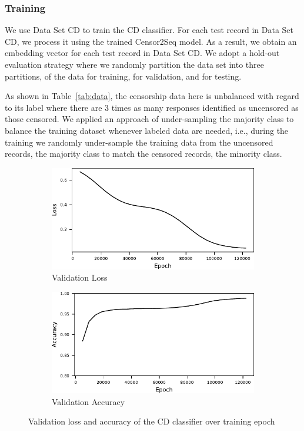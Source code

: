 \subsubsection{Training}
\label{sec:eval:cd:train}

We use Data Set CD to train the CD classifier. For each test record in Data Set
CD, we process it using the trained Censor2Seq model. As a result, we obtain an
embedding vector for each test record in Data Set CD. We adopt a
hold-out evaluation strategy where we randomly partition the data set
into three partitions, \CDtrainratio of the data for training, \CDvalidratio
for validation, and \CDtestratio for testing. 

As shown in Table~\ref{tab:data}, the censorship data here is unbalanced with
regard to its label where there are 3 times as many responses identified as
uncensored as those censored.  We applied an approach of under-sampling the
majority class to balance the training dataset whenever labeled data are
needed, i.e., during the training we randomly under-sample the training data
from the uncensored records, the majority class to match the censored records,
the minority class.


\begin{figure}[!htbp]
  \centering
	\begin{subfigure}[b]{0.8\columnwidth}
		\centering
		\includegraphics[width=\textwidth]{figures/le_val_loss.pdf}
		\caption{Validation Loss}
    \label{fig:le_val_loss}
	\end{subfigure}
	\hfill
	\begin{subfigure}[b]{0.8\columnwidth}
		\centering
		\includegraphics[width=\textwidth]{figures/le_val_acc.pdf}
		\caption{Validation Accuracy}
    \label{fig:le_val_acc}
	\end{subfigure}
	\caption{Validation loss and accuracy of the CD classifier over training epoch}
	\label{fig:cd:train}
\end{figure}

